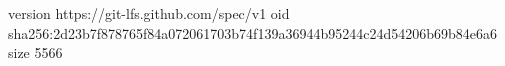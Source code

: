 version https://git-lfs.github.com/spec/v1
oid sha256:2d23b7f878765f84a072061703b74f139a36944b95244c24d54206b69b84e6a6
size 5566

